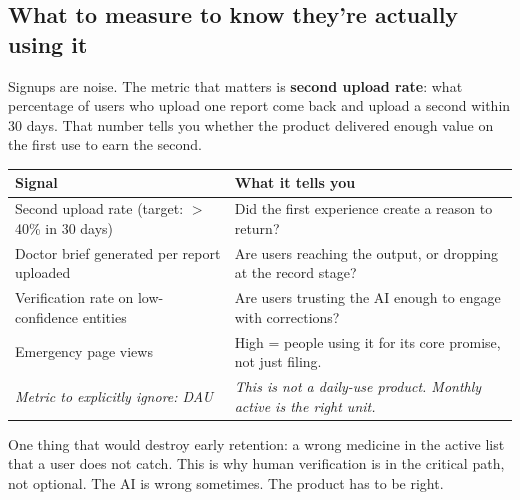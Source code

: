 \documentclass[11pt, a4paper]{article}
\begin{document}
\subsection*{What to measure to know they're actually using it}

Signups are noise. The metric that matters is \textbf{second upload rate}: what percentage of users who upload one report come back and upload a second within 30 days. That number tells you whether the product delivered enough value on the first use to earn the second.

\vspace{4pt}
\begin{tabularx}{\linewidth}{@{}L{7cm} X@{}}
\toprule
\textbf{Signal} & \textbf{What it tells you} \\
\midrule
Second upload rate (target: $>$40\% in 30 days) & Did the first experience create a reason to return? \\
Doctor brief generated per report uploaded & Are users reaching the output, or dropping at the record stage? \\
Verification rate on low-confidence entities & Are users trusting the AI enough to engage with corrections? \\
Emergency page views & High = people using it for its core promise, not just filing. \\
\midrule
\textit{Metric to explicitly ignore: DAU} & \textit{This is not a daily-use product. Monthly active is the right unit.} \\
\bottomrule
\end{tabularx}

\vspace{8pt}

One thing that would destroy early retention: a wrong medicine in the active list that a user does not catch. This is why human verification is in the critical path, not optional. The AI is wrong sometimes. The product has to be right.
\end{document}
